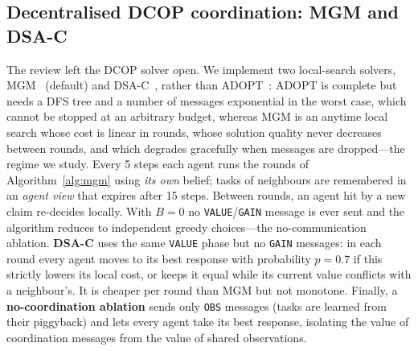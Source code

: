 \documentclass{article}
\begin{document}
\subsection{Decentralised DCOP coordination: MGM and DSA-C}\label{sec:mgm}
The review left the DCOP solver open. We implement two local-search solvers, MGM~\cite{maheswaran2004} (default) and
DSA-C~\cite{zhang2005}, rather than ADOPT~\cite{modi2005}: ADOPT is complete but
needs a DFS tree and a number of messages exponential in the worst case, which cannot be stopped at an arbitrary budget,
whereas MGM is an anytime local search whose cost is linear in rounds, whose solution quality never decreases between
rounds, and which degrades gracefully when messages are dropped---the regime we study. Every 5 steps each agent runs
the rounds of Algorithm~\ref{alg:mgm} using \emph{its own} belief; tasks of neighbours are remembered in an
\emph{agent view} that expires after 15 steps. Between rounds, an agent hit by a new claim re-decides locally. With
$B=0$ no \texttt{VALUE}/\texttt{GAIN} message is ever sent and the algorithm reduces to independent greedy choices---the
no-communication ablation. \textbf{DSA-C} uses the same \texttt{VALUE} phase but no \texttt{GAIN} messages: in each
round every agent moves to its best response with probability $p=0.7$ if this strictly lowers its local cost, or keeps
it equal while its current value conflicts with a neighbour's. It is cheaper per round than MGM but not monotone.
Finally, a \textbf{no-coordination ablation} sends only \texttt{OBS} messages (tasks are learned from their piggyback)
and lets every agent take its best response, isolating the value of coordination messages from the value of shared
observations.
\end{document}
